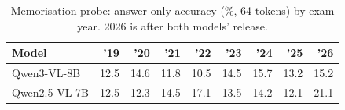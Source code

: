 \begin{table}[!t]
\centering
\footnotesize
\caption{Memorisation probe: answer-only accuracy (\%, 64 tokens) by exam year. 2026 is after both models' release.}
\label{tab:probes}
\setlength{\tabcolsep}{3.5pt}
\begin{tabular}{lrrrrrrrr}
\toprule
Model & '19 & '20 & '21 & '22 & '23 & '24 & '25 & '26 \\
\midrule
Qwen3-VL-8B & 12.5 & 14.6 & 11.8 & 10.5 & 14.5 & 15.7 & 13.2 & 15.2 \\
Qwen2.5-VL-7B & 12.5 & 12.3 & 14.5 & 17.1 & 13.5 & 14.2 & 12.1 & 21.1 \\
\bottomrule
\end{tabular}
\end{table}
